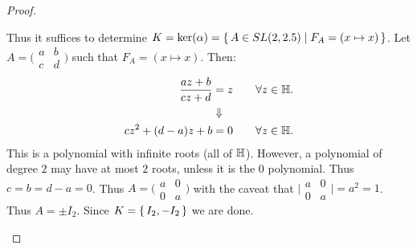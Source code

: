 \begin{proof}
\begin{enumerate}
    
    Thus it suffices to determine $K = \ker ( \alpha) = \set{A \in SL(2,2.5) \mid F_A = (x \mapsto x)}$. Let $A= \big(\begin{smallmatrix}
  a & b\\
  c & d
\end{smallmatrix}\big)$ such that $F_A = (x \mapsto x)$. Then:
\begin{align*}
    \frac{az + b}{cz + d} &= z \qquad \forall z \in \mathbb{H}.\\
    &\Downarrow\\
    cz^2 + (d-a) z + b &= 0 \qquad \forall z \in \mathbb{H}.
\end{align*}
This is a polynomial with infinite roots (all of $\mathbb{H}$). However, a polynomial of degree $2$ may have at most $2$ roots, unless it is the $0$ polynomial. Thus $c = b = d-a = 0$. Thus $A= \big(\begin{smallmatrix}
  a & 0\\
  0 & a
\end{smallmatrix}\big)$ with the caveat that $ \big|\begin{smallmatrix}
  a & 0\\
  0 & a
\end{smallmatrix}\big|   = a^2 = 1$. Thus $A = \pm I_2$. Since $K = \set{ I_2, -I_2}$ we are done.
\end{enumerate}


\end{proof}


